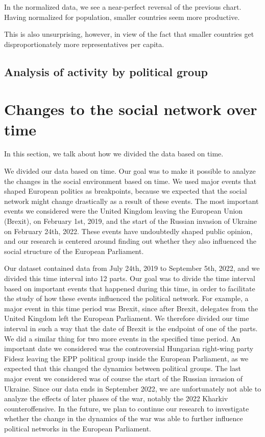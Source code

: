 \documentclass[lettersize,journal]{IEEEtran}
\begin{document}
In the normalized data, we see a near-perfect reversal of the previous chart. Having normalized for population, smaller countries seem more productive.

This is also unsurprising, however, in view of the fact that smaller countries get disproportionately more representatives per capita. 

\subsection{Analysis of activity by political group}

\section{Changes to the social network over time}

In this section, we talk about how we divided the data based on time.

We divided our data based on time. Our goal was to make it possible to analyze the changes in the social environment based on time. We used major events that shaped European politics as breakpoints, because we expected that the social network might change drastically as a result of these events. The most important events we considered were the United Kingdom leaving the European Union (Brexit), on February 1st, 2019, and the start of the Russian invasion of Ukraine on February 24th, 2022. These events have undoubtedly shaped public opinion, and our research is centered around finding out whether they also influenced the social structure of the European Parliament.

Our dataset contained data from July 24th, 2019 to September 5th, 2022, and we divided this time interval into 12 parts. Our goal was to divide the time interval based on important events that happened during this time, in order to facilitate the study of how these events influenced the political network. For example, a major event in this time period was Brexit, since after Brexit, delegates from the United Kingdom left the European Parliament. We therefore divided our time interval in such a way that the date of Brexit is the endpoint of one of the parts. We did a similar thing for two more events in the specified time period. An important date we considered was the controversial Hungarian right-wing party Fidesz leaving the EPP political group inside the European Parliament, as we expected that this changed the dynamics between political groups. The last major event we considered was of course the start of the Russian invasion of Ukraine. Since our data ends in September 2022, we are unfortunately not able to analyze the effects of later phases of the war, notably the 2022 Kharkiv counteroffensive. In the future, we plan to continue our research to investigate whether the change in the dynamics of the war was able to further influence political networks in the European Parliament.
\end{document}
